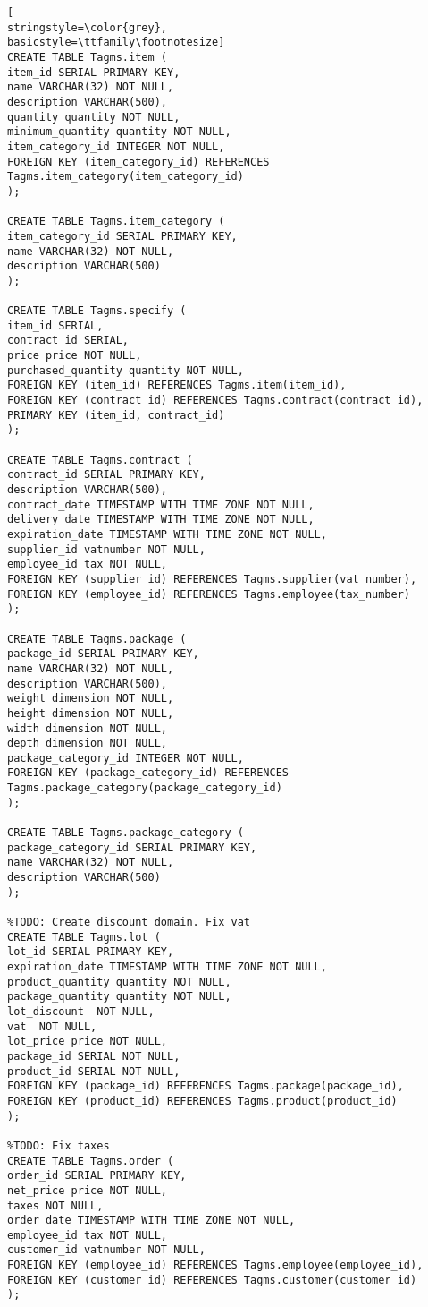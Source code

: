 \begin{lstlisting}[
stringstyle=\color{grey},
basicstyle=\ttfamily\footnotesize]
CREATE TABLE Tagms.item (
item_id SERIAL PRIMARY KEY,
name VARCHAR(32) NOT NULL,
description VARCHAR(500),
quantity quantity NOT NULL,
minimum_quantity quantity NOT NULL,
item_category_id INTEGER NOT NULL,
FOREIGN KEY (item_category_id) REFERENCES Tagms.item_category(item_category_id)
);

CREATE TABLE Tagms.item_category (
item_category_id SERIAL PRIMARY KEY,
name VARCHAR(32) NOT NULL,
description VARCHAR(500)
);

CREATE TABLE Tagms.specify (
item_id SERIAL,
contract_id SERIAL,
price price NOT NULL,
purchased_quantity quantity NOT NULL,
FOREIGN KEY (item_id) REFERENCES Tagms.item(item_id),
FOREIGN KEY (contract_id) REFERENCES Tagms.contract(contract_id),
PRIMARY KEY (item_id, contract_id)
);

CREATE TABLE Tagms.contract (
contract_id SERIAL PRIMARY KEY,
description VARCHAR(500),
contract_date TIMESTAMP WITH TIME ZONE NOT NULL,
delivery_date TIMESTAMP WITH TIME ZONE NOT NULL,
expiration_date TIMESTAMP WITH TIME ZONE NOT NULL,
supplier_id vatnumber NOT NULL,
employee_id tax NOT NULL,
FOREIGN KEY (supplier_id) REFERENCES Tagms.supplier(vat_number),
FOREIGN KEY (employee_id) REFERENCES Tagms.employee(tax_number)
);

CREATE TABLE Tagms.package (
package_id SERIAL PRIMARY KEY,
name VARCHAR(32) NOT NULL,
description VARCHAR(500),
weight dimension NOT NULL,
height dimension NOT NULL,
width dimension NOT NULL,
depth dimension NOT NULL,
package_category_id INTEGER NOT NULL,
FOREIGN KEY (package_category_id) REFERENCES Tagms.package_category(package_category_id)
);

CREATE TABLE Tagms.package_category (
package_category_id SERIAL PRIMARY KEY,
name VARCHAR(32) NOT NULL,
description VARCHAR(500)
);

%TODO: Create discount domain. Fix vat
CREATE TABLE Tagms.lot (
lot_id SERIAL PRIMARY KEY,
expiration_date TIMESTAMP WITH TIME ZONE NOT NULL,
product_quantity quantity NOT NULL,
package_quantity quantity NOT NULL,
lot_discount  NOT NULL,
vat  NOT NULL,
lot_price price NOT NULL,
package_id SERIAL NOT NULL,
product_id SERIAL NOT NULL,
FOREIGN KEY (package_id) REFERENCES Tagms.package(package_id),
FOREIGN KEY (product_id) REFERENCES Tagms.product(product_id)
);

%TODO: Fix taxes
CREATE TABLE Tagms.order (
order_id SERIAL PRIMARY KEY,
net_price price NOT NULL,
taxes NOT NULL,
order_date TIMESTAMP WITH TIME ZONE NOT NULL,
employee_id tax NOT NULL,
customer_id vatnumber NOT NULL,
FOREIGN KEY (employee_id) REFERENCES Tagms.employee(employee_id),
FOREIGN KEY (customer_id) REFERENCES Tagms.customer(customer_id)
);


\end{lstlisting}
